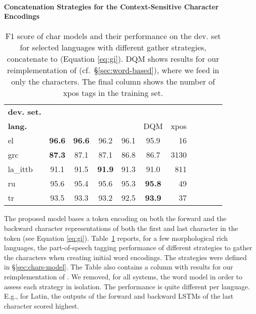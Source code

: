 \documentclass[11pt,a4paper]{article}
\begin{document}
\paragraph{Concatenation Strategies for the Context-Sensitive Character Encodings}
\begin{table}[t!]
\begin{center}
\small
\setlength{\tabcolsep}{5pt}
\begin{tabular}{|l|c|c|c|c|c|r|l||r|r|r}
\hline 
\bf dev. set.&  &  &  &  & & \\
\bf lang. &  &  &  &  & DQM & xpos\\ 
\hline
el	       &\bf 96.6	& \bf 96.6	&96.2	& 96.1	  & 95.9 &16\\ 
grc	       &\bf 87.3	& 87.1	& 87.1	&86.8     &86.7 &3130\\
la\_ittb   & 91.1	&91.5	&\bf 91.9	&91.3	  &91.0 &811\\
ru         & 95.6    & 95.4	& 95.6	&95.3	  &\bf95.8 &49\\
tr	       & 93.5   & 93.3	&93.2	&92.5     &\bf 93.9  &37\\ \hline
\end{tabular}
\end{center}

\caption{\label{table:char-models} F1 score of char models and their performance on the dev. set for selected languages
with different gather strategies, concatenate to  (Equation \ref{eq:gi}).
DQM shows results for our reimplementation of  (cf.\ \S\ref{sec:word-based}), where we feed in only the characters. The final column shows the number of xpos tags in the training set.}
\vspace{-0.3cm}
\end{table}

The proposed model bases a token encoding on both the forward and the backward character representations of both the first and last character in the token (see Equation \ref{eq:gi}).
Table~\ref{table:char-models} reports, for a few morphological rich languages, the part-of-speech tagging performance of different strategies to gather the characters when creating initial word encodings. The strategies were defined in \S\ref{sec:chars-model}. The Table also contains a column with results for our reimplementation of . We removed, for all systems, the word model in order to assess each strategy in isolation. The performance is quite different per language. E.g., for Latin, the outputs of the forward and backward LSTMs of the last character scored highest.
\end{document}
